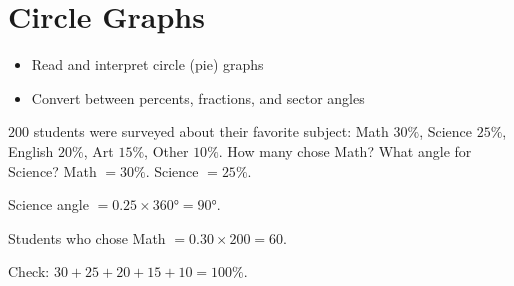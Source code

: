 \section{Circle Graphs}

\begin{stepGoal}
\begin{itemize}
    \item Read and interpret circle (pie) graphs
    \item Convert between percents, fractions, and sector angles
\end{itemize}
\end{stepGoal}

\begin{stepVocabBox}
\end{stepVocabBox}

\begin{stepsCard}
\end{stepsCard}

\begin{stepExample}{$200$ students were surveyed about their favorite subject: Math $30\%$, Science $25\%$, English $20\%$, Art $15\%$, Other $10\%$. How many chose Math? What angle for Science?}
     Math $= 30\%$. Science $= 25\%$.

     Science angle $= 0.25 \times 360° = 90°$.

     Students who chose Math $= 0.30 \times 200 = 60$.

     Check: $30 + 25 + 20 + 15 + 10 = 100\%$. \checkmark
\end{stepExample}

